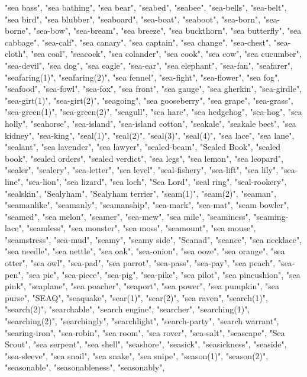 "sea bass",
"sea bathing",
"sea bear",
"seabed",
"seabee",
"sea-bells",
"sea-belt",
"sea bird",
"sea blubber",
"seaboard",
"sea-boat",
"seaboot",
"sea-born",
"sea-borne",
"sea-bow",
"sea-bream",
"sea breeze",
"sea buckthorn",
"sea butterfly",
"sea cabbage",
"sea-calf",
"sea canary",
"sea captain",
"sea change",
"sea-chest",
"sea-cloth",
"sea coal",
"seacock",
"sea colander",
"sea cook",
"sea cow",
"sea cucumber",
"sea-devil",
"sea dog",
"sea eagle",
"sea-ear",
"sea elephant",
"sea-fan",
"seafarer",
"seafaring(1)",
"seafaring(2)",
"sea fennel",
"sea-fight",
"sea-flower",
"sea fog",
"seafood",
"sea-fowl",
"sea-fox",
"sea front",
"sea gauge",
"sea gherkin",
"sea-girdle",
"sea-girt(1)",
"sea-girt(2)",
"seagoing",
"sea gooseberry",
"sea grape",
"sea-grass",
"sea-green(1)",
"sea-green(2)",
"seagull",
"sea hare",
"sea hedgehog",
"sea-hog",
"sea holly",
"seahorse",
"sea-island",
"sea-island cotton",
"seakale",
"seakale beet",
"sea kidney",
"sea-king",
"seal(1)",
"seal(2)",
"seal(3)",
"seal(4)",
"sea lace",
"sea lane",
"sealant",
"sea lavender",
"sea lawyer",
"sealed-beam",
"Sealed Book",
"sealed book",
"sealed orders",
"sealed verdict",
"sea legs",
"sea lemon",
"sea leopard",
"sealer",
"sealery",
"sea-letter",
"sea level",
"seal-fishery",
"sea-lift",
"sea lily",
"sea-line",
"sea-lion",
"sea lizard",
"sea loch",
"Sea Lord",
"seal ring",
"seal-rookery",
"sealskin",
"Sealyham",
"Sealyham terrier",
"seam(1)",
"seam(2)",
"seaman",
"seamanlike",
"seamanly",
"seamanship",
"sea-mark",
"sea-mat",
"seam bowler",
"seamed",
"sea melon",
"seamer",
"sea-mew",
"sea mile",
"seaminess",
"seaming-lace",
"seamless",
"sea monster",
"sea moss",
"seamount",
"sea mouse",
"seamstress",
"sea-mud",
"seamy",
"seamy side",
"Seanad",
"seance",
"sea necklace",
"sea needle",
"sea nettle",
"sea oak",
"sea-onion",
"sea ooze",
"sea orange",
"sea otter",
"sea owl",
"sea-pad",
"sea parrot",
"sea-pass",
"sea-pay",
"sea peach",
"sea-pen",
"sea pie",
"sea-piece",
"sea-pig",
"sea-pike",
"sea pilot",
"sea pincushion",
"sea pink",
"seaplane",
"sea poacher",
"seaport",
"sea power",
"sea pumpkin",
"sea purse",
"SEAQ",
"seaquake",
"sear(1)",
"sear(2)",
"sea raven",
"search(1)",
"search(2)",
"searchable",
"search engine",
"searcher",
"searching(1)",
"searching(2)",
"searchingly",
"searchlight",
"search-party",
"search warrant",
"searing-iron",
"sea-robin",
"sea room",
"sea rover",
"sea-salt",
"seascape",
"Sea Scout",
"sea serpent",
"sea shell",
"seashore",
"seasick",
"seasickness",
"seaside",
"sea-sleeve",
"sea snail",
"sea snake",
"sea snipe",
"season(1)",
"season(2)",
"seasonable",
"seasonableness",
"seasonably",
